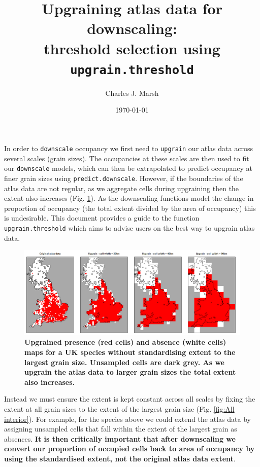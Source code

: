 \documentclass{article}[12pt, a4paper]
\begin{document}




\title{Upgraining atlas data for downscaling: \\ threshold selection using \texttt{upgrain.threshold}}
\author{Charles J. Marsh}
\date{\today}
\maketitle

In order to \texttt{downscale} occupancy we first need to \texttt{upgrain} our atlas data across several scales (grain sizes). The occupancies at these scales are then used to fit our \texttt{downscale} models, which can then be extrapolated to predict occupancy at finer grain sizes using \texttt{predict.downscale}. However, if the boundaries of the atlas data are not regular, as we aggregate cells during upgraining then the extent also increases (Fig. \ref{fig:Original upgrain}). As the downscaling functions model the change in proportion of occupancy (the total extent divided by the area of occupancy) this is undesirable. This document provides a guide to the function \texttt{upgrain.threshold} which aims to advise users on the best way to upgrain atlas data.

\begin{figure}[bh]
\centering
\includegraphics[width=\linewidth]{Original_upgrain.png}
\caption{\textbf{Upgrained presence (red cells) and absence (white cells) maps for a UK species without standardising extent to the largest grain size. Unsampled cells are dark grey. As we upgrain the atlas data to larger grain sizes the total extent also increases.}}
\label{fig:Original upgrain}
\end{figure}

Instead we must ensure the extent is kept constant across all scales by fixing the extent at all grain sizes to the extent of the largest grain size (Fig. \ref{fig:All interior}). For example, for the species above we could extend the atlas data by assigning unsampled cells that fall within the extent of the largest grain as absences. \textbf{It is then critically important that after downscaling we convert our proportion of occupied cells back to area of occupancy by using the standardised extent, not the original atlas data extent}.
\end{document}
